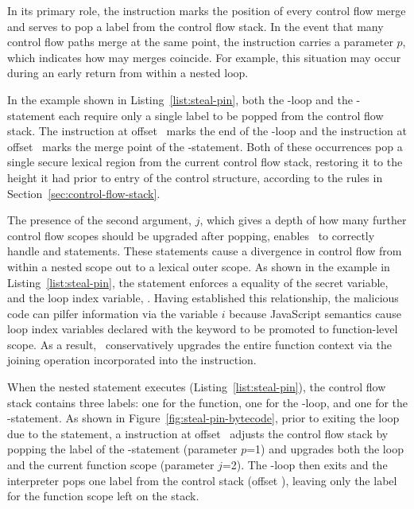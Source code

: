 In its primary role, the \popj instruction marks the position of every control flow merge and serves to pop a label from the control flow stack.
In the event that many control flow paths merge at the same point, the \popj instruction carries a parameter $p$, which indicates how may merges coincide.
For example, this situation may occur during an early return from within a nested loop.

In the example shown in Listing~\ref{list:steal-pin}, both the -loop and the -statement each require only a single label to be popped from the control flow stack.
The \popj instruction at offset~ marks the end of the -loop and the \popj instruction at offset~ marks the merge point of the -statement.
Both of these occurrences pop a single secure lexical region from the current control flow stack, restoring it to the height it had prior to entry of the control structure, according to the rules in Section~\ref{sec:control-flow-stack}.

The presence of the second argument, $j$, which gives a depth of how many further control flow scopes should be upgraded after popping, enables \FlowCore\ to correctly handle  and  statements.
These statements cause a divergence in control flow from within a nested scope out to a lexical outer scope.
As shown in the example in Listing~\ref{list:steal-pin}, the  statement enforces a equality of the secret variable,  and the loop index variable, .
Having established this relationship, the malicious code can pilfer information via the variable $i$ because JavaScript semantics cause loop index variables declared with the  keyword to be promoted to function-level scope.
As a result, \FlowCore\ conservatively upgrades the entire function context via the joining operation incorporated into the \popj instruction.

When the nested  statement executes (Listing~\ref{list:steal-pin}), the control flow stack contains three labels: one for the function, one for the -loop, and one for the -statement.
As shown in Figure~\ref{fig:steal-pin-bytecode}, prior to exiting the loop due to the  statement, a \popj instruction at offset~ adjusts the control flow stack by popping the label of the -statement (parameter $p$=1) and upgrades both the  loop and the current function scope (parameter $j$=2).
The -loop then exits and the interpreter pops one label from the control stack (offset ), leaving only the label for the function scope left on the stack.

